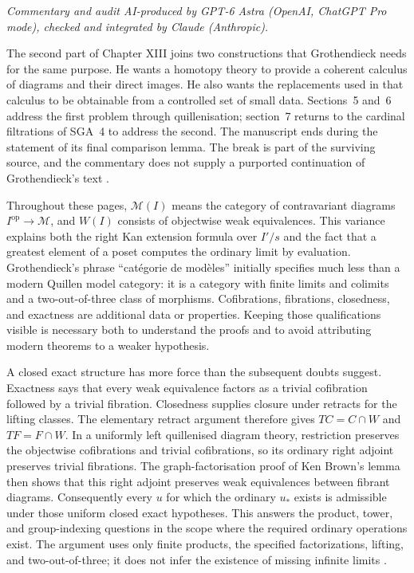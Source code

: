 \noindent\textit{Commentary and audit AI-produced by GPT-6 Astra (OpenAI, ChatGPT Pro mode), checked and integrated by Claude (Anthropic).}

The second part of Chapter XIII joins two constructions that Grothendieck needs for the same purpose. He wants a homotopy theory to provide a coherent calculus of diagrams and their direct images. He also wants the replacements used in that calculus to be obtainable from a controlled set of small data. Sections~5 and~6 address the first problem through quillenisation; section~7 returns to the cardinal filtrations of SGA~4 to address the second. The manuscript ends during the statement of its final comparison lemma. The break is part of the surviving source, and the commentary does not supply a purported continuation of Grothendieck's text \citep{GrothendieckDerivateursXIII}.

Throughout these pages, $\mathcal M(I)$ means the category of contravariant diagrams $I^{\mathrm{op}}\to\mathcal M$, and $W(I)$ consists of objectwise weak equivalences. This variance explains both the right Kan extension formula over $I'/s$ and the fact that a greatest element of a poset computes the ordinary limit by evaluation. Grothendieck's phrase ``cat\'egorie de mod\`eles'' initially specifies much less than a modern Quillen model category: it is a category with finite limits and colimits and a two-out-of-three class of morphisms. Cofibrations, fibrations, closedness, and exactness are additional data or properties. Keeping those qualifications visible is necessary both to understand the proofs and to avoid attributing modern theorems to a weaker hypothesis.

A closed exact structure has more force than the subsequent doubts suggest. Exactness says that every weak equivalence factors as a trivial cofibration followed by a trivial fibration. Closedness supplies closure under retracts for the lifting classes. The elementary retract argument therefore gives $TC=C\cap W$ and $TF=F\cap W$. In a uniformly left quillenised diagram theory, restriction preserves the objectwise cofibrations and trivial cofibrations, so its ordinary right adjoint preserves trivial fibrations. The graph-factorisation proof of Ken Brown's lemma then shows that this right adjoint preserves weak equivalences between fibrant diagrams. Consequently every $u$ for which the ordinary $u_*$ exists is admissible under those uniform closed exact hypotheses. This answers the product, tower, and group-indexing questions in the scope where the required ordinary operations exist. The argument uses only finite products, the specified factorizations, lifting, and two-out-of-three; it does not infer the existence of missing infinite limits \citep[Lemmas~1.1.9 and~1.1.12]{Hovey1999}.

